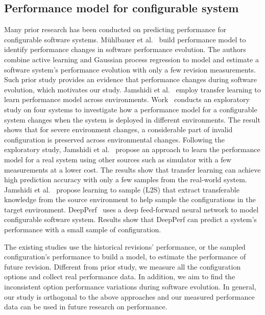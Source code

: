 \subsection{Performance model for configurable system}
Many prior research has been conducted on predicting performance for configurable software systems. 
M{\"{u}}hlbauer et al.~\cite{DBLP:conf/kbse/MuhlbauerAS19,DBLP:conf/kbse/MuhlbauerAS20} build performance model to identify performance changes in software performance evolution. The authors combine active learning and Gaussian process regression to model and estimate a software system’s performance evolution with only a few revision measurements. Such prior study provides an evidence that performance changes during software evolution, which motivates our study. Jamshidi et al.~\cite{DBLP:conf/kbse/JamshidiSVKPA17,DBLP:conf/icse/JamshidiVKSK17,DBLP:conf/sigsoft/JamshidiVKS18} employ transfer learning to learn performance model across environments. Work~\cite{DBLP:conf/kbse/JamshidiSVKPA17} conducts an exploratory study on four systems to investigate how a performance model for a configurable system changes when the system is deployed in different environments. The result shows that for severe environment changes, a considerable part of invalid configuration is preserved across environmental changes. Following the exploratory study, Jamshidi et al.~\cite{DBLP:conf/icse/JamshidiVKSK17} propose an approach to learn the performance model for a real system using other sources such as simulator with a few measurements at a lower cost. The results show that transfer learning can achieve high prediction accuracy with only a few samples from the real-world system. Jamshidi et al.~\cite{DBLP:conf/sigsoft/JamshidiVKS18} propose learning to sample (L2S) that extract transferable knowledge from the source environment to help sample the configurations in the target environment. DeepPerf~\cite{DBLP:conf/icse/HaZ19} uses a deep feed-forward neural network to model configurable software system. Results show that DeepPerf can predict a system's performance with a small sample of configuration. 

The existing studies use the historical revisions’ performance, or the sampled configuration’s performance to build a model, to estimate the performance of future revision. Different from prior study, we measure all the configuration options and collect real performance data. In addition, we aim to find the inconsistent option performance variations during software evolution. In general, our study is orthogonal to the above approaches and our measured performance data can be used in future research on performance.

